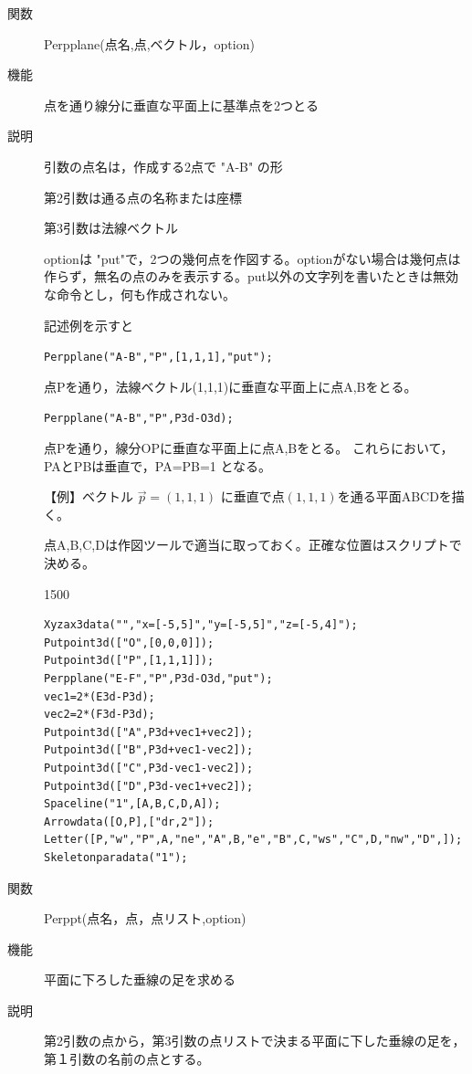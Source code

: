 \documentclass[papersize,a4paper,12pt,uplatex]{jsarticle}
\begin{document}
\begin{description}


\vspace{\baselineskip}
\hypertarget{perpplane}{}
\item[関数]Perpplane(点名,点,ベクトル，option)
\item[機能]点を通り線分に垂直な平面上に基準点を2つとる
\item[説明]引数の点名は，作成する2点で "A-B" の形

第2引数は通る点の名称または座標

第3引数は法線ベクトル

optionは "put"で，2つの幾何点を作図する。optionがない場合は幾何点は作らず，無名の点のみを表示する。put以外の文字列を書いたときは無効な命令とし，何も作成されない。

記述例を示すと

 \verb|Perpplane("A-B","P",[1,1,1],"put");|

点Pを通り，法線ベクトル(1,1,1)に垂直な平面上に点A,Bをとる。

 \verb|Perpplane("A-B","P",P3d-O3d);|
 
 点Pを通り，線分OPに垂直な平面上に点A,Bをとる。
 これらにおいて，PAとPBは垂直で，PA=PB=1 となる。
 
\vspace{\baselineskip}
【例】ベクトル $\vec{p}=(1,1,1)$ に垂直で点$(1,1,1)$を通る平面ABCDを描く。

点A,B,C,Dは作図ツールで適当に取っておく。正確な位置はスクリプトで決める。

\begin{layer}{150}{0}
\end{layer}

\begin{verbatim}
Xyzax3data("","x=[-5,5]","y=[-5,5]","z=[-5,4]");
Putpoint3d(["O",[0,0,0]]);
Putpoint3d(["P",[1,1,1]]);
Perpplane("E-F","P",P3d-O3d,"put");
vec1=2*(E3d-P3d);
vec2=2*(F3d-P3d);
Putpoint3d(["A",P3d+vec1+vec2]);
Putpoint3d(["B",P3d+vec1-vec2]);
Putpoint3d(["C",P3d-vec1-vec2]);
Putpoint3d(["D",P3d-vec1+vec2]);
Spaceline("1",[A,B,C,D,A]);
Arrowdata([O,P],["dr,2"]);
Letter([P,"w","P",A,"ne","A",B,"e","B",C,"ws","C",D,"nw","D",]);
Skeletonparadata("1");
\end{verbatim}

\hypertarget{perppt}{}
\item[関数]Perppt(点名，点，点リスト,option)
\item[機能]平面に下ろした垂線の足を求める
\item[説明]第2引数の点から，第3引数の点リストで決まる平面に下した垂線の足を，第１引数の名前の点とする。


\end{description}
\end{document}
